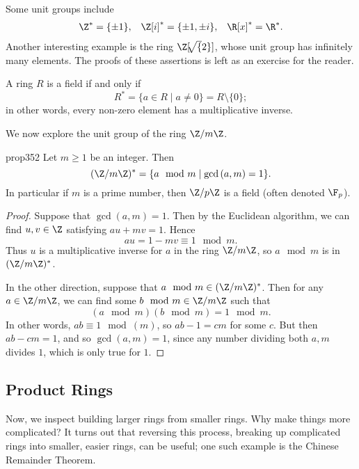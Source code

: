 \documentclass[math1530-lecture-notes]{subfiles}
\begin{document}
\begin{example}
  Some unit groups include
  \begin{align*}
    \Z^*=\{ \pm 1 \}, && \Z[i]^*=\{ \pm 1,\pm i \}, && \R[x]^*=\R^*
  .\end{align*} Another interesting example is the ring $\Z[\sqrt[]{2} ]$, whose unit group has
  infinitely many elements. The proofs of these assertions is left as an exercise for the reader.
\end{example}

\begin{example}
  A ring $R$ is a field if and only if \[
    R^* = \{a\in R\mid a\neq 0\} = R \setminus \{ 0 \}
  ;\] in other words, every non-zero element has a multiplicative inverse.
\end{example}

We now explore the unit group of the ring $\Z / m\Z$.
\begin{proposition}[]{prop352}
  Let $m\ge 1$ be an integer. Then \[
    (\Z / m\Z)^* = \{a\mod{m}\mid \gcd{(a,m)}=1\} 
  .\] In particular if $m$ is a prime number, then $\Z / p\Z$ is a field (often denoted $\F_p$).
\end{proposition}
\begin{proof}[Proof]
  Suppose that $\gcd{(a,m)}=1$. Then by the Euclidean algorithm, we can find $u,v\in \Z$ satisfying
  $au+mv=1$. Hence \[
    au = 1-mv \equiv 1 \mod{m}
  .\] Thus $u$ is a multiplicative inverse for $a$ in the ring $\Z / m\Z$, so $a\mod{m}$ is in $(\Z
  / m\Z)^*$.

  In the other direction, suppose that $a\mod{m}\in (\Z / m\Z)^*$. Then for any $a\in \Z / m\Z$, we
  can find some $b\mod{m}\in \Z / m\Z$ such that \[
    (a\mod{m})(b\mod{m})=1\mod{m}
  .\] In other words, $ab\equiv 1\mod{(m)}$, so $ab-1=cm$ for some $c$. But then $ab-cm=1$, and so
  $\gcd{(a,m)}=1$, since any number dividing both $a,m$ divides $1$, which is only true for $1$.
\end{proof}


\subsection{Product Rings}

Now, we inspect building larger rings from smaller rings. Why make things more complicated? It turns
out that reversing this process, breaking up complicated rings into smaller, easier rings, can be
useful; one such example is the Chinese Remainder Theorem.
\end{document}
